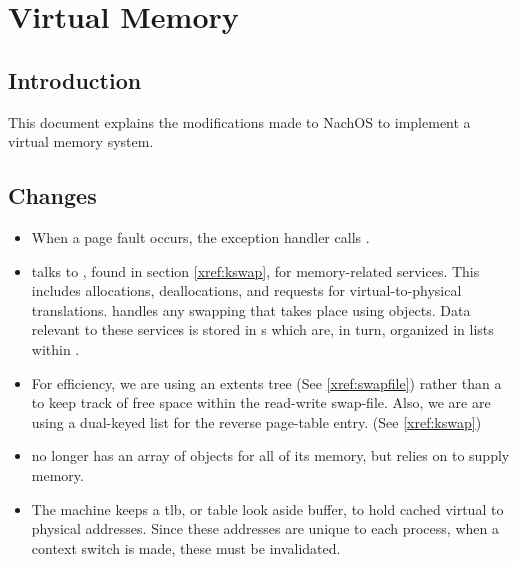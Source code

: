   \chapter{Virtual Memory}
  \section{Introduction}
    This document explains the modifications made to NachOS to implement
    a virtual memory system.
  \section{Changes}
    \begin{itemize}
      \item When a page fault occurs, the exception handler
            calls .
      \item {} talks to , found in section 
	    \ref{xref:kswap}, for memory-related services.  This includes
	    allocations, deallocations, and requests for 
	    virtual-to-physical translations.   handles any
	    swapping that takes place using  objects.  Data relevant
	    to these services is stored in s which are, in 
	    turn, organized in lists within .
      \item For efficiency, we are using an extents tree 
      	    (See \ref{xref:swapfile}) rather than a  to keep track 
	    of free space within the read-write swap-file.  Also, we are are
	    using a dual-keyed list for the reverse page-table entry.
	    (See \ref{xref:kswap})
      \item {} no longer has an array of 
	     objects for all of its memory, but relies
	    on  to supply memory.
      \item The machine keeps a tlb, or table look aside buffer, to hold cached
	    virtual to physical addresses.  Since these addresses are unique 
	    to each process, when a context switch is made, these must be 
	    invalidated.
    \end{itemize}
